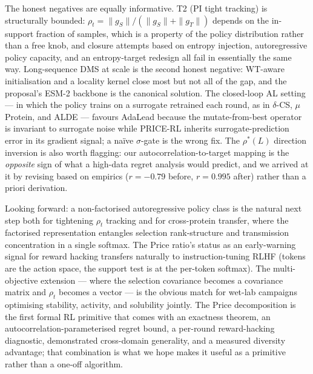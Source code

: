 The honest negatives are equally informative. T2 (PI tight tracking) is structurally bounded: $\rho_t = \|g_S\|/(\|g_S\|+\|g_T\|)$ depends on the in-support fraction of samples, which is a property of the policy distribution rather than a free knob, and closure attempts based on entropy injection, autoregressive policy capacity, and an entropy-target redesign all fail in essentially the same way. Long-sequence DMS at scale is the second honest negative: WT-aware initialisation and a locality kernel close most but not all of the gap, and the proposal's ESM-2 backbone is the canonical solution. The closed-loop AL setting --- in which the policy trains on a surrogate retrained each round, as in $\delta$-CS, $\mu$Protein, and ALDE --- favours AdaLead because the mutate-from-best operator is invariant to surrogate noise while PRICE-RL inherits surrogate-prediction error in its gradient signal; a naïve $\sigma$-gate is the wrong fix. The $\rho^*(L)$ direction inversion is also worth flagging: our autocorrelation-to-target mapping is the \emph{opposite} sign of what a high-data regret analysis would predict, and we arrived at it by revising based on empirics ($r=-0.79$ before, $r=0.995$ after) rather than a priori derivation.

Looking forward: a non-factorised autoregressive policy class is the natural next step both for tightening $\rho_t$ tracking and for cross-protein transfer, where the factorised representation entangles selection rank-structure and transmission concentration in a single softmax. The Price ratio's status as an early-warning signal for reward hacking transfers naturally to instruction-tuning RLHF (tokens are the action space, the support test is at the per-token softmax). The multi-objective extension --- where the selection covariance becomes a covariance matrix and $\rho_t$ becomes a vector --- is the obvious match for wet-lab campaigns optimising stability, activity, and solubility jointly. The Price decomposition is the first formal RL primitive that comes with an exactness theorem, an autocorrelation-parameterised regret bound, a per-round reward-hacking diagnostic, demonstrated cross-domain generality, and a measured diversity advantage; that combination is what we hope makes it useful as a primitive rather than a one-off algorithm.
